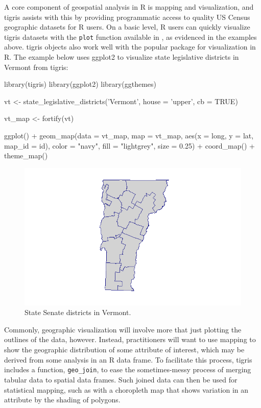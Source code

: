 A core component of geospatial analysis in R is mapping and
visualization, and tigris assists with this by providing programmatic
access to quality US Census geographic datasets for R users. On a basic
level, R users can quickly visualize tigris datasets with the
\texttt{plot} function available in , as evidenced in the
examples above. tigris objects also work well with the popular
 package for visualization in R. The example below uses
ggplot2 to visualize state legislative districts in Vermont from tigris:

\begin{Schunk}
\begin{Sinput}
library(tigris)
library(ggplot2)
library(ggthemes)

vt <- state_legislative_districts('Vermont', house = 'upper', cb = TRUE)

vt_map <- fortify(vt)

ggplot() + 
  geom_map(data = vt_map, map = vt_map, 
           aes(x = long, y = lat, map_id = id), 
           color = "navy", fill = "lightgrey", 
           size = 0.25) + 
  coord_map() + 
  theme_map()
\end{Sinput}
\end{Schunk}

\begin{figure}[htbp]
  \centering
  \includegraphics[width=\textwidth]{vt_districts}
  \caption{State Senate districts in Vermont.}
  \label{figure:vt_districts}
\end{figure}

Commonly, geographic visualization will involve more that just plotting
the outlines of the data, however. Instead, practitioners will want to
use mapping to show the geographic distribution of some attribute of
interest, which may be derived from some analysis in an R data frame. To
facilitate this process, tigris includes a function, \texttt{geo\_join},
to ease the sometimes-messy process of merging tabular data to spatial
data frames. Such joined data can then be used for statistical mapping,
such as with a choropleth map that shows variation in an attribute by
the shading of polygons.

